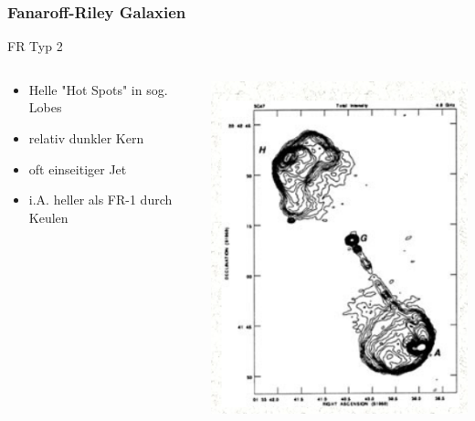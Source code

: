 \documentclass[aspectratio=1610, 9pt]{beamer}
\begin{document}
\begin{frame}\frametitle{Fanaroff-Riley Galaxien}
  \begin{block}{FR Typ 2}
  \begin{columns}
  \begin{column}[c]{0.45\linewidth}
    \begin{itemize}
      \item Helle "Hot Spots" in sog. Lobes
      \item relativ dunkler Kern
      \item oft einseitiger Jet
      \item i.A. heller als FR-1 durch Keulen
    \end{itemize}
  \end{column}
  \begin{column}[c]{0.45\linewidth}
    \includegraphics{images/FR2.png}
  \end{column}
  \end{columns}
  \end{block}
\end{frame}
\end{document}
